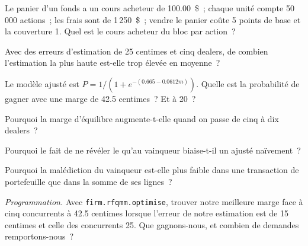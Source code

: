 \begin{exercise}[$\star$]\label{exo:hf:bond-and-etf-request-for-quote-market-making:1}
Le panier d'un fonds a un cours acheteur de 100.00~\$~; chaque unité compte 50\,000 actions~; les frais sont de 1\,250~\$~; vendre le panier coûte 5 points de base et la couverture 1. Quel est le
cours acheteur du bloc par action~?
\end{exercise}

\begin{exercise}[$\star$]\label{exo:hf:bond-and-etf-request-for-quote-market-making:2}
Avec des erreurs d'estimation de 25 centimes et cinq dealers, de combien l'estimation la plus haute est-elle trop élevée en moyenne~?
\end{exercise}

\begin{exercise}[$\star$]\label{exo:hf:bond-and-etf-request-for-quote-market-making:3}
Le modèle ajusté est $P=1/(1+e^{-(0.665-0.0612m)})$. Quelle est la probabilité de gagner avec une marge de 42.5 centimes~? Et à 20~?
\end{exercise}

\begin{exercise}[$\star\star$]\label{exo:hf:bond-and-etf-request-for-quote-market-making:4}
Pourquoi la marge d'équilibre augmente-t-elle quand on passe de cinq à dix dealers~?
\end{exercise}

\begin{exercise}[$\star\star$]\label{exo:hf:bond-and-etf-request-for-quote-market-making:5}
Pourquoi le fait de ne révéler le  qu'au vainqueur biaise-t-il un  ajusté naïvement~?
\end{exercise}

\begin{exercise}[$\star\star$]\label{exo:hf:bond-and-etf-request-for-quote-market-making:6}
Pourquoi la malédiction du vainqueur est-elle plus faible dans une transaction de portefeuille que dans la somme de ses lignes~?
\end{exercise}

\begin{exercise}[$\star\star\star$]\label{exo:hf:bond-and-etf-request-for-quote-market-making:7}
\emph{Programmation.} Avec \texttt{firm.rfqmm.optimise}, trouver notre meilleure marge face à cinq concurrents à 42.5 centimes lorsque l'erreur de notre estimation est de 15
centimes et celle des concurrents 25. Que gagnons-nous, et combien de demandes remportons-nous~?
\end{exercise}

